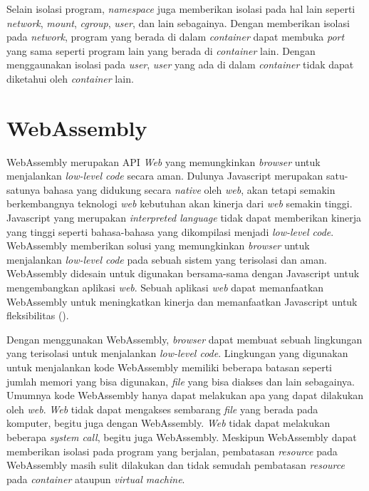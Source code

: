 \par Selain isolasi program, \textit{namespace} juga memberikan isolasi pada hal lain seperti \textit{network}, \textit{mount}, \textit{cgroup}, \textit{user}, dan lain sebagainya. Dengan memberikan isolasi pada \textit{network}, program yang berada di dalam \textit{container} dapat membuka \textit{port} yang sama seperti program lain yang berada di \textit{container} lain. Dengan menggaunakan isolasi pada \textit{user}, \textit{user} yang ada di dalam \textit{container} tidak dapat diketahui oleh \textit{container} lain.

\section{WebAssembly}

\par WebAssembly merupakan API \textit{Web} yang memungkinkan \textit{browser} untuk menjalankan \textit{low-level code} secara aman. Dulunya Javascript merupakan satu-satunya bahasa yang didukung secara \textit{native} oleh \textit{web}, akan tetapi semakin berkembangnya teknologi \textit{web} kebutuhan akan kinerja dari \textit{web} semakin tinggi. Javascript yang merupakan \textit{interpreted language} tidak dapat memberikan kinerja yang tinggi seperti bahasa-bahasa yang dikompilasi menjadi \textit{low-level code}. WebAssembly memberikan solusi yang memungkinkan \textit{browser} untuk menjalankan \textit{low-level code} pada sebuah sistem yang terisolasi dan aman. WebAssembly didesain untuk digunakan bersama-sama dengan Javascript untuk mengembangkan aplikasi \textit{web}. Sebuah aplikasi \textit{web} dapat memanfaatkan WebAssembly untuk meningkatkan kinerja dan memanfaatkan Javascript untuk fleksibilitas (\cite{mdnwebasm}).

\par Dengan menggunakan WebAssembly, \textit{browser} dapat membuat sebuah lingkungan yang terisolasi untuk menjalankan \textit{low-level code}. Lingkungan yang digunakan untuk menjalankan kode WebAssembly memiliki beberapa batasan seperti jumlah memori yang bisa digunakan, \textit{file} yang bisa diakses dan lain sebagainya. Umumnya kode WebAssembly hanya dapat melakukan apa yang dapat dilakukan oleh \textit{web}. \textit{Web} tidak dapat mengakses sembarang \textit{file} yang berada pada komputer, begitu juga dengan WebAssembly. \textit{Web} tidak dapat melakukan beberapa \textit{system call}, begitu juga WebAssembly. Meskipun WebAssembly dapat memberikan isolasi pada program yang berjalan, pembatasan \textit{resource} pada WebAssembly masih sulit dilakukan dan tidak semudah pembatasan \textit{resource} pada \textit{container} ataupun \textit{virtual machine}. 

